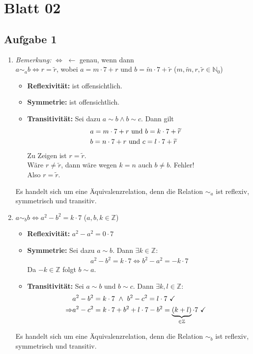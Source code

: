 \chapter{Blatt 02}
\section{Aufgabe 1}
\begin{enumerate}[label={\alph*)}]
  \item \textit{Bemerkung:} $\Leftrightarrow$ $\longleftarrow$ genau, wenn dann \\
  $a\sim_{a}b \Leftrightarrow r=\widetilde{r}$, wobei $a=m\cdot 7+r$ und $b=\widetilde{m}\cdot 7+\widetilde{r}$ ($m, \widetilde{m}, r, \widetilde{r}\in\mathbb{N}_{0}$)
  \begin{itemize}[label=\textbullet]
    \item \textbf{Reflexivität:} ist offensichtlich.
    \item \textbf{Symmetrie:}  ist offensichtlich.
    \item \textbf{Transitivität:} Sei dazu $a\sim b \wedge b\sim c$. Dann gilt
    \begin{align}
       &a=m\cdot 7+r \textnormal{ und } b=k\cdot 7+\widetilde{r}&\\
       &b=n\cdot 7+r \textnormal{ und } c=l\cdot 7+\widetilde{r}
    \end{align}
    Zu Zeigen ist $r=\widetilde{r}$.\\
    Wäre $r\neq \widetilde{r}$, dann wäre wegen $k=n$ auch $b\neq b$. Fehler!\\
    Also $r=\widetilde{r}$.
  \end{itemize}
  Es handelt sich um eine Äquivalenzrelation, denn die Relation $\sim_{a}$ ist reflexiv, symmetrisch und transitiv.
  \item
  $a\sim_{b}b \Leftrightarrow a^2-b^2=k\cdot 7$ ($a, b, k \in\mathbb{Z}$)
  \begin{itemize}[label=\textbullet]
    \item \textbf{Reflexivität:} $a^2-a^2=0\cdot 7$ \checkmark
    \item \textbf{Symmetrie:} Sei dazu $a\sim b$. Dann $\exists k\in \mathbb{Z}$:
    \begin{align}
      &a^2-b^2=k\cdot 7 \Leftrightarrow b^2-a^2=-k\cdot 7&
    \end{align}
    Da $-k \in \mathbb{Z}$ folgt $b\sim a$.
    \item \textbf{Transitivität:} Sei $a\sim b$ und $b\sim c$. Dann $\exists k,l \in \mathbb{Z}$:
    \begin{align}
      & a^2-b^2=k\cdot 7 \textnormal{ }\wedge\textnormal{ } b^2-c^2=l\cdot 7 \textnormal{ \checkmark}&\\
      \Rightarrow &a^2-c^2=k\cdot 7 + b^2+l\cdot 7 -b^2=\underbrace{(k+l)}_{\in\mathbb{Z}}\cdot 7 \textnormal{ \checkmark}
    \end{align}
  \end{itemize}
  Es handelt sich um eine Äquivalenzrelation, denn die Relation $\sim_{b}$ ist reflexiv, symmetrisch und transitiv.
\end{enumerate}
